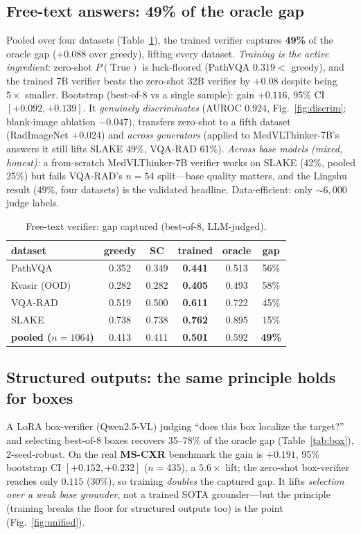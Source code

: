 \documentclass[conference]{IEEEtran}
\begin{document}
\subsection{Free-text answers: 49\% of the oracle gap}
Pooled over four datasets (Table~\ref{tab:verif}), the trained verifier captures \textbf{49\%} of the oracle gap ($+0.088$ over greedy), lifting every dataset. \emph{Training is the active ingredient}: zero-shot $P(\text{True})$ is luck-floored (PathVQA $0.319<$ greedy), and the trained 7B verifier beats the zero-shot 32B verifier by $+0.08$ despite being $5\times$ smaller. Bootstrap (best-of-8 vs a single sample): gain $+0.116$, 95\% CI $[+0.092,+0.139]$. It \emph{genuinely discriminates} (AUROC $0.924$, Fig.~\ref{fig:discrim}; blank-image ablation $-0.047$), transfers zero-shot to a fifth dataset (RadImageNet $+0.024$) and \emph{across generators} (applied to MedVLThinker-7B's answers it still lifts SLAKE 49\%, VQA-RAD 61\%). \emph{Across base models (mixed, honest):} a from-scratch MedVLThinker-7B verifier works on SLAKE (42\%, pooled 25\%) but fails VQA-RAD's $n{=}54$ split---base quality matters, and the Lingshu result (49\%, four datasets) is the validated headline. Data-efficient: only ${\sim}6{,}000$ judge labels.

\begin{table}[t]\centering\caption{Free-text verifier: gap captured (best-of-8, LLM-judged).}\label{tab:verif}
\footnotesize
\begin{tabular}{lccccc}
\toprule
dataset & greedy & SC & trained & oracle & gap\\
\midrule
PathVQA & 0.352 & 0.349 & \textbf{0.441} & 0.513 & 56\%\\
Kvasir (OOD) & 0.282 & 0.282 & \textbf{0.405} & 0.493 & 58\%\\
VQA-RAD & 0.519 & 0.500 & \textbf{0.611} & 0.722 & 45\%\\
SLAKE & 0.738 & 0.738 & \textbf{0.762} & 0.895 & 15\%\\
\textbf{pooled ($n{=}1064$)} & 0.413 & 0.411 & \textbf{0.501} & 0.592 & \textbf{49\%}\\
\bottomrule
\end{tabular}
\end{table}

\subsection{Structured outputs: the same principle holds for boxes}
A LoRA box-verifier (Qwen2.5-VL) judging ``does this box localize the target?'' and selecting best-of-8 boxes recovers 35--78\% of the oracle gap (Table~\ref{tab:box}), 2-seed-robust. On the real \textbf{MS-CXR} benchmark the gain is $+0.191$, 95\% bootstrap CI $[+0.152,+0.232]$ ($n{=}435$), a $5.6\times$ lift; the zero-shot box-verifier reaches only $0.115$ (30\%), so training \emph{doubles} the captured gap. It lifts \emph{selection over a weak base grounder}, not a trained SOTA grounder---but the principle (training breaks the floor for structured outputs too) is the point (Fig.~\ref{fig:unified}).
\end{document}
